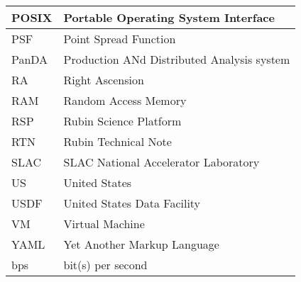 \begin{longtable}{p{}p{}}
POSIX & Portable Operating System Interface \\\hline
PSF & Point Spread Function \\\hline
PanDA &  Production ANd Distributed Analysis system \\\hline
RA & Right Ascension \\\hline
RAM & Random Access Memory \\\hline
RSP & Rubin Science Platform \\\hline
RTN & Rubin Technical Note \\\hline
SLAC & SLAC National Accelerator Laboratory \\\hline
US & United States \\\hline
USDF & United States Data Facility \\\hline
VM & Virtual Machine \\\hline
YAML & Yet Another Markup Language \\\hline
bps & bit(s) per second \\\hline
\end{longtable}
